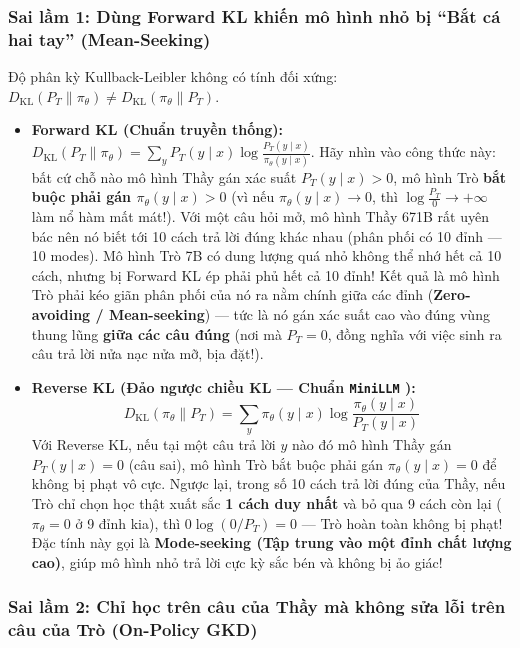 \subsubsection{Sai lầm 1: Dùng Forward KL khiến mô hình nhỏ bị ``Bắt cá hai tay'' (Mean-Seeking)}

Độ phân kỳ Kullback-Leibler không có tính đối xứng: $D_{\text{KL}}(P_T \parallel \pi_\theta) \neq D_{\text{KL}}(\pi_\theta \parallel P_T)$.
\begin{itemize}
  \item \textbf{Forward KL (Chuẩn truyền thống):} $D_{\text{KL}}(P_T \parallel \pi_\theta) = \sum_{y} P_T(y \mid x) \log \frac{P_T(y \mid x)}{\pi_\theta(y \mid x)}$.
  Hãy nhìn vào công thức này: bất cứ chỗ nào mô hình Thầy gán xác suất $P_T(y \mid x) > 0$, mô hình Trò \textbf{bắt buộc phải gán $\pi_\theta(y \mid x) > 0$} (vì nếu $\pi_\theta(y \mid x) \to 0$, thì $\log \frac{P_T}{0} \to +\infty$ làm nổ hàm mất mát!).
  Với một câu hỏi mở, mô hình Thầy 671B rất uyên bác nên nó biết tới 10 cách trả lời đúng khác nhau (phân phối có 10 đỉnh --- 10 modes). Mô hình Trò 7B có dung lượng quá nhỏ không thể nhớ hết cả 10 cách, nhưng bị Forward KL ép phải phủ hết cả 10 đỉnh! Kết quả là mô hình Trò phải kéo giãn phân phối của nó ra nằm chính giữa các đỉnh (\textbf{Zero-avoiding / Mean-seeking}) --- tức là nó gán xác suất cao vào đúng vùng thung lũng \textbf{giữa các câu đúng} (nơi mà $P_T = 0$, đồng nghĩa với việc sinh ra câu trả lời nửa nạc nửa mỡ, bịa đặt!).
  \item \textbf{Reverse KL (Đảo ngược chiều KL --- Chuẩn \texttt{MiniLLM} \citealt{gu2024minillm}):}
  \begin{equation}
    D_{\text{KL}}(\pi_\theta \parallel P_T) = \sum_{y} \pi_\theta(y \mid x) \log \frac{\pi_\theta(y \mid x)}{P_T(y \mid x)}
    \label{eq:reverse_kl_distill}
  \end{equation}
  Với Reverse KL, nếu tại một câu trả lời $y$ nào đó mô hình Thầy gán $P_T(y \mid x) = 0$ (câu sai), mô hình Trò bắt buộc phải gán $\pi_\theta(y \mid x) = 0$ để không bị phạt vô cực. Ngược lại, trong số 10 cách trả lời đúng của Thầy, nếu Trò chỉ chọn học thật xuất sắc \textbf{1 cách duy nhất} và bỏ qua 9 cách còn lại ($\pi_\theta = 0$ ở 9 đỉnh kia), thì $0 \log(0/P_T) = 0$ --- Trò hoàn toàn không bị phạt! Đặc tính này gọi là \textbf{Mode-seeking (Tập trung vào một đỉnh chất lượng cao)}, giúp mô hình nhỏ trả lời cực kỳ sắc bén và không bị ảo giác!
\end{itemize}

\subsubsection{Sai lầm 2: Chỉ học trên câu của Thầy mà không sửa lỗi trên câu của Trò (On-Policy GKD)}

